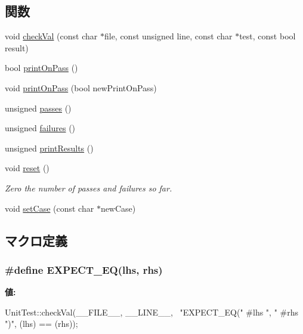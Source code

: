 \subsection*{関数}
\begin{DoxyCompactItemize}
\item 
void \hyperlink{namespaceUnitTest_aaeea6aae1b9fc9fde2eb06e2cdb95b77}{checkVal} (const char $\ast$file, const unsigned line, const char $\ast$test, const bool result)
\item 
bool \hyperlink{namespaceUnitTest_a4fe39db6ba9297515e7cd97e88c6ad78}{printOnPass} ()
\item 
void \hyperlink{namespaceUnitTest_a6b02bd4200bdf54eee13e52e4dae4625}{printOnPass} (bool newPrintOnPass)
\item 
unsigned \hyperlink{namespaceUnitTest_a9638f40b9823e54879efe5e0c75a6bfe}{passes} ()
\item 
unsigned \hyperlink{namespaceUnitTest_a8c0151028e98183841c13b41f180a0d3}{failures} ()
\item 
unsigned \hyperlink{namespaceUnitTest_a19207173d818ba00e0b61392a76e04e9}{printResults} ()
\item 
void \hyperlink{namespaceUnitTest_ad20897c5c8bd47f5d4005989bead0e55}{reset} ()
\begin{DoxyCompactList}\small\item\em Zero the number of passes and failures so far. \item\end{DoxyCompactList}\item 
void \hyperlink{namespaceUnitTest_a4a369bd22c7170bddaa89e471e3620c6}{setCase} (const char $\ast$newCase)
\end{DoxyCompactItemize}


\subsection{マクロ定義}
\hypertarget{unittest_8hh_aa3e555662b0eca178fd8a576e9000f95}{
\subsubsection[{EXPECT\_\-EQ}]{\setlength{\rightskip}{0pt plus 5cm}\#define EXPECT\_\-EQ(lhs, \/  rhs)}}
\label{unittest_8hh_aa3e555662b0eca178fd8a576e9000f95}
{\bfseries 値:}
\begin{DoxyCode}
UnitTest::checkVal(__FILE__, __LINE__, \
            "EXPECT_EQ(" #lhs ", " #rhs ")", (lhs) == (rhs));
\end{DoxyCode}


